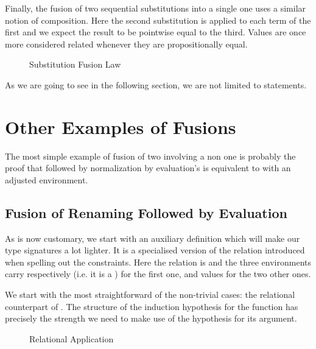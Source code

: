 Finally, the fusion of two sequential substitutions into a single one uses a
similar notion of composition. Here the second substitution is applied to each
term of the first and we expect the result to be pointwise equal to the third.
Values are once more considered related whenever they are propositionally equal.

\begin{figure}[h]
\caption{Substitution Fusion Law\label{fig:subsub}}
\end{figure}

As we are going to see in the following section, we are not limited
to  statements.

\section{Other Examples of Fusions}

The most simple example of fusion of two  involving a non 
one is probably the proof that  followed by normalization by evaluation's
 is equivalent to  with an adjusted environment.

\subsection{Fusion of Renaming Followed by Evaluation}
\label{sec:fusionrennbe}

As is now customary, we start with an auxiliary definition which will make our
type signatures a lot lighter. It is a specialised version of the relation 
introduced when spelling out the  constraints. Here the relation is 
and the three environments carry respectively  (i.e. it is a ) for
the first one, and  values for the two other ones.


We start with the most straightforward of the non-trivial cases: the relational
counterpart of . The  structure of the induction hypothesis
for the function has precisely the strength we need to make use of the hypothesis
for its argument.

\begin{figure}[h]
\caption{Relational Application}
\end{figure}

